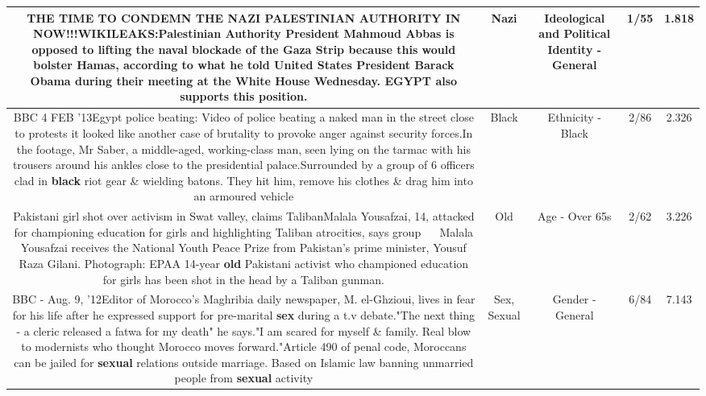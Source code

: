 \documentclass[11pt]{article}
\newlength\mylength
\begin{document}
\begin{center}
\begin{longtable}{|C{.65\mylength}|C{.30\mylength}|C{.12\mylength}|C{.12\mylength}|C{.12\mylength}|}
  \small THE TIME TO CONDEMN THE \textbf{NAZI} PALESTINIAN AUTHORITY IN NOW!!!WIKILEAKS:Palestinian Authority President Mahmoud Abbas is opposed to lifting the naval blockade of the Gaza Strip because this would bolster Hamas, according to what he told United States President Barack Obama during their meeting at the White House Wednesday. EGYPT also supports this position.\normalsize   & Nazi &  Ideological and Political Identity - General & 1/55 & 1.818 \\  \hline
  \small BBC 4 FEB '13Egypt police beating: Video of police beating a naked man in the street close to protests it looked like another case of brutality to provoke anger against security forces.In the footage, Mr Saber, a middle-aged, working-class man, seen lying on the tarmac with his trousers around his ankles close to the presidential palace.Surrounded by a group of 6 officers clad in \textbf{black} riot gear \& wielding batons. They hit him, remove his clothes \& drag him into an armoured vehicle\normalsize   & Black & Ethnicity - Black & 2/86 & 2.326 \\  \hline
  \small Pakistani girl shot over activism in Swat valley, claims TalibanMalala Yousafzai, 14, attacked for championing education for girls and highlighting Taliban atrocities, says group     Malala Yousafzai receives the National Youth Peace Prize from Pakistan's prime minister, Yousuf Raza Gilani. Photograph: EPAA 14-year \textbf{old} Pakistani activist who championed education for girls has been shot in the head by a Taliban gunman.\normalsize   & Old & Age - Over 65s & 2/62 & 3.226 \\  \hline
  \small BBC - Aug. 9, '12Editor of Morocco's Maghribia daily newspaper, M. el-Ghzioui, lives in fear for his life after he expressed support for pre-marital \textbf{sex} during a t.v debate."The next thing - a cleric released a fatwa for my death" he says."I am scared for myself \& family. Real blow to modernists who thought Morocco moves forward."Article 490 of penal code, Moroccans can be jailed for \textbf{sexual} relations outside marriage. Based on Islamic law banning unmarried people from \textbf{sexual} activity\normalsize   & Sex, Sexual & Gender - General & 6/84 & 7.143 \\  \hline

\end{longtable}
\end{center}
\end{document}
